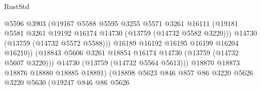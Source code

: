 \begin{lexlean}{RustStd}
\begin{coremodule}
                                            @5596
                                            @3903
                                            (@19167
                                              @5588
                                              @5595
                                              @3255
                                              @5571
                                              @3261
                                              @16111
                                              (@19181
                                                @5581
                                                @3261
                                                @19192
                                                @16174
                                                @14730
                                                (@13759 (@14732 @5582 @3220)))
                                              @14730
                                              (@13759 (@14732 @5572 @5588)))
                                            @16189
                                            @16192
                                            @16195
                                            @16199
                                            @16204
                                            @16210))
                                        (@18843
                                          @5606
                                          @3261
                                          @18854
                                          @16174
                                          @14730
                                          (@13759 (@14732 @5607 @3220)))
                                        @14730
                                        (@13759 (@14732 @5564 @5613)))
                                      @18870
                                      @18873
                                      @18876
                                      @18880
                                      @18885
                                      @18891)
                                    (@18898
                                      @5623
                                      @846
                                      @857
                                      @86
                                      @3220
                                      @5626
                                      @3220
                                      @5630
                                      (@19247
                                        @846
                                        @86
                                        @5626

\end{coremodule}
\end{lexlean}
